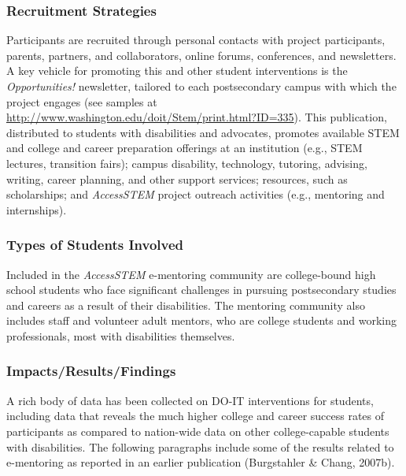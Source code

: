 \documentclass[11.5pt]{sig-alternate} %
\begin{document}
\begin{large}
\subsubsection*{Recruitment Strategies}
Participants are recruited through personal contacts with project participants, parents, partners, and collaborators, online forums, conferences, and newsletters. A key vehicle for promoting this and other student interventions is the \textit{Opportunities!} newsletter, tailored to each postsecondary campus with which the project engages (see samples at \url{http://www.washington.edu/doit/Stem/print.html?ID=335}). This publication, distributed to students with disabilities and advocates, promotes available STEM and college and career preparation offerings at an institution (e.g., STEM lectures, transition fairs); campus disability, technology, tutoring, advising, writing, career planning, and other support services; resources, such as scholarships; and \textit{AccessSTEM} project outreach activities (e.g., mentoring and internships). 

\subsubsection*{Types of Students Involved}
Included in the \textit{AccessSTEM} e-mentoring community are college-bound high school students who face significant challenges in pursuing postsecondary studies and careers as a result of their disabilities. The mentoring community also includes staff and volunteer adult mentors, who are college students and working professionals, most with disabilities themselves.

\subsubsection*{Impacts/Results/Findings}
A rich body of data has been collected on DO-IT interventions for students, including data that reveals the much higher college and career success rates of participants as compared to nation-wide data on other college-capable students with disabilities. The following paragraphs include some of the results related to e-mentoring as reported in an earlier publication (Burgstahler \& Chang, 2007b).


\end{large}
\end{document}
